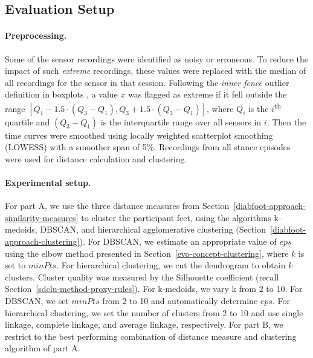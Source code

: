 \documentclass[
  oneside]{book}
\begin{document}
\hypertarget{diabfoot-approach-evaluation}{%
\subsection{Evaluation Setup}\label{diabfoot-approach-evaluation}}

\paragraph*{Preprocessing.}

Some of the sensor recordings were identified as noisy or erroneous.
To reduce the impact of such \emph{extreme} recordings, these values were replaced with the median of all recordings for the sensor in that session.
Following the \emph{inner fence} outlier definition in boxplots \autocite{hoaglin2003john}, a value \(x\) was flagged as extreme if it fell outside the range \([Q_1 - 1. 5 \cdot (Q_3 - Q_1), Q_3 + 1.5 \cdot (Q_3 - Q_1)]\), where \(Q_i\) is the \(i\)\textsuperscript{th} quartile and \((Q_3 - Q_1)\) is the interquartile range over all sensors in \(i\).
Then the time curves were smoothed using locally weighted scatterplot smoothing (LOWESS) \autocite{Cleveland:LOWESS1981} with a smoother span of 5\%.
Recordings from all stance episodes were used for distance calculation and clustering.

\paragraph*{Experimental setup.}

For part A, we use the three distance measures from Section~\ref{diabfoot-approach-similarity-measures} to cluster the participant feet, using the algorithms k-medoids, DBSCAN, and hierarchical agglomerative clustering (Section~\ref{diabfoot-approach-clustering}).
For DBSCAN, we estimate an appropriate value of \(eps\) using the elbow method presented in Section~\ref{evo-concept-clustering}, where \(k\) is set to \(minPts\).
For hierarchical clustering, we cut the dendrogram to obtain \(k\) clusters.
Cluster quality was measured by the Silhouette coefficient (recall Section~\ref{sdclu-method-proxy-rules}).
For k-medoids, we vary k from 2 to 10.
For DBSCAN, we set \(minPts\) from 2 to 10 and automatically determine \(eps\).
For hierarchical clustering, we set the number of clusters from 2 to 10 and use single linkage, complete linkage, and average linkage, respectively.
For part B, we restrict to the best performing combination of distance measure and clustering algorithm of part A.
\end{document}

